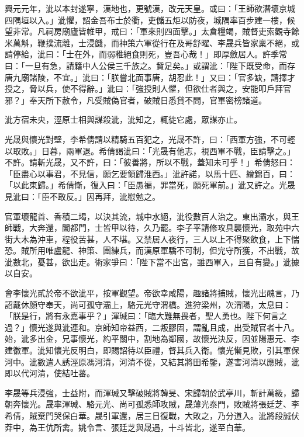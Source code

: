 \begin{pinyinscope}
 興元元年，泚以本封遂寧，漢地也，更號漢，改元天皇。或曰：「王師欲潛壞京城四隅垣以入。」泚懼，詔金吾布士於衢，吏儲五炬以防夜，城隅率百步建一樓，候望非常。凡祠房廟廬皆帷甲，戒曰：「軍來則四面擊。」太倉糧竭，賊督吏索觀寺餘米萬斛，鞭撲流離，士浸饑，而神策六軍從行在及哥舒曜、李晟兵皆家稟不絕，或請停給，泚曰：「士在外，而弱稚絕食則死，豈吾心哉！」即厚斂居人。許季常曰：「一旦有急，請籍中人公侯三千族之。貲足矣。」或謂泚：「陛下既受命，而存唐九廟諸陵，不宜。」泚曰：「朕嘗北面事唐，胡忍此！」又曰：「官多缺，請擇才授之，脅以兵，使不得辭。」泚曰：「強授則人懼，但欲仕者與之，安能叩戶拜官邪？」奉天所下赦令，凡受賊偽官者，破賊日悉貸不問，官軍密榜諸道。



 泚方宿未央，涇原士相與謀殺泚，泚知之，輒徙它處，眾謀亦止。



 光晟與懷光對壁，李希倩請以精騎五百犯之，光晟不許，曰：「西軍方強，不可輕以取敗。」日暮，兩軍退。希倩謁泚曰：「光晟有他志，視西軍不戰，臣請擊之。」不許。請斬光晟，又不許，曰：「彼善將，所以不戰，蓋知未可乎！」希倩怒曰：「臣盡心以事君，不見信，願乞要領歸淮西。」泚許諾，以馬十匹、繒錦百，曰：「以此東歸。」希倩慚，復入曰：「臣愚褊，罪當死，願死軍前。」泚又許之。光晟見泚曰：「臣不敢反。」因再拜，泚慰勉之。



 官軍壞龍首、香積二堨，以決其流，城中水絕，泚役數百人治之。東出灞水，與王師戰，大奔還，闔都門，士皆甲以待，久乃罷。李子平請修攻具襲懷光，取苑中六街大木為沖車，程役苦甚，人不堪。又禁居人夜行，三人以上不得聚飲食，上下惴恐。賊所用唯盧龍、神策、團練兵，而漢原軍驕不可制，但完守所獲，不出戰，故泚數北，憂甚，欲出走。術家爭曰：「陛下當不出宮，雖西軍入，且自有變。」泚據以自安。



 會李懷光貳於帝不欲泚平，按軍觀望。帝欲幸咸陽，趣諸將捕賊，懷光出醜言，乃詔戴休顏守奉天，尚可孤守灞上，駱元光守渭橋。進狩梁州，次渭陽，太息曰：「朕是行，將有永嘉事乎？」渾瑊曰：「臨大難無畏者，聖人勇也。陛下何言之過？」懷光遂與泚連和。京師知帝益西，二叛膠固，謂亂且成，出受賊官者十八。始，泚多出金，兄事懷光，約平關中，割地為鄰國，故懷光決反，因並陽惠元、李建徽軍。泚知懷光反明白，即賜詔待以臣禮，督其兵入衛。懷光慚見欺，引其軍保河中。泚數遣人誘涇原馮河清，河清不從，又結其將田希鑒，遂害河清以應賊，泚即以代河清，使結吐蕃。



 李晟等兵浸強，士益附，而渾瑊又擊破賊將韓旻、宋歸朝於武亭川，斬計萬級，歸朝奔懷光。晟率渾瑊、駱元光、尚可孤悉師攻賊，晟薄光泰門，敗賊將張廷芝、李希倩，賊棄門哭保白華。晟引軍還，居三日復戰，大敗之，乃分道入。泚將段誠伏莽中，為王伉所禽。姚令言、張廷芝與晟遇，十斗皆北，遂至白華。




\end{pinyinscope}
